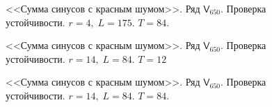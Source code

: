 \documentclass[specialist,
               substylefile = spbu.rtx,
               subf,href,colorlinks=true, 12p]{disser}
\begin{document}
\begin{figure}[h]
	\captionsetup{justification=centering}
	\caption{<<Сумма синусов с красным шумом>>. Ряд $\mathsf{V}_{650}$. Проверка устойчивости. $r = 4, \; L = 175$. $T = 84$.}
	\label{sigserrloopsr4.84}
\end{figure}

\begin{figure}[h]
	\captionsetup{justification=centering}
	\caption{<<Сумма синусов с красным шумом>>. Ряд $\mathsf{V}_{650}$. Проверка устойчивости. $r = 14, \; L = 84$. $T = 12$}
	\label{sigserrloopsr14.12}
\end{figure}

\begin{figure}[h]
	\captionsetup{justification=centering}
	\caption{<<Сумма синусов с красным шумом>>. Ряд $\mathsf{V}_{650}$. Проверка устойчивости. $r = 14, \; L = 84$. $T = 84$.}
	\label{sigserrloopsr14.84}
\end{figure}
\end{document}
